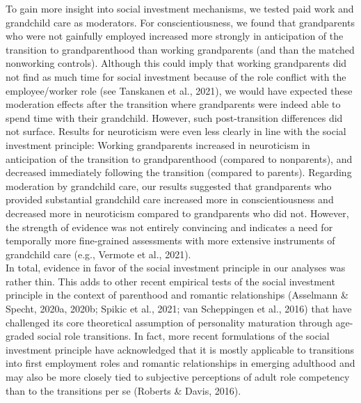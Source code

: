 \documentclass[
  english,
  man, noextraspace]{apa7}
\begin{document}
To gain more insight into social investment mechanisms, we tested paid work and grandchild care as moderators. For conscientiousness, we found that grandparents who were not gainfully employed increased more strongly in anticipation of the transition to grandparenthood than working grandparents (and than the matched nonworking controls). Although this could imply that working grandparents did not find as much time for social investment because of the role conflict with the employee/worker role (see Tanskanen et al., 2021), we would have expected these moderation effects after the transition where grandparents were indeed able to spend time with their grandchild. However, such post-transition differences did not surface. Results for neuroticism were even less clearly in line with the social investment principle: Working grandparents increased in neuroticism in anticipation of the transition to grandparenthood (compared to nonparents), and decreased immediately following the transition (compared to parents). Regarding moderation by grandchild care, our results suggested that grandparents who provided substantial grandchild care increased more in conscientiousness and decreased more in neuroticism compared to grandparents who did not. However, the strength of evidence was not entirely convincing and indicates a need for temporally more fine-grained assessments with more extensive instruments of grandchild care (e.g., Vermote et al., 2021).\\
In total, evidence in favor of the social investment principle in our analyses was rather thin. This adds to other recent empirical tests of the social investment principle in the context of parenthood and romantic relationships (Asselmann \& Specht, 2020a, 2020b; Spikic et al., 2021; van Scheppingen et al., 2016) that have challenged its core theoretical assumption of personality maturation through age-graded social role transitions. In fact, more recent formulations of the social investment principle have acknowledged that it is mostly applicable to transitions into first employment roles and romantic relationships in emerging adulthood and may also be more closely tied to subjective perceptions of adult role competency than to the transitions per se (Roberts \& Davis, 2016).\\
\end{document}
